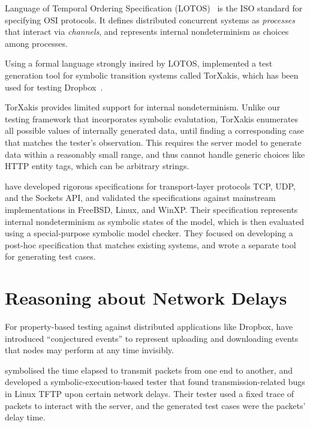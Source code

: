 \documentclass[12pt,oneside]{amsbook}
\numberwithin{section}{chapter}
\numberwithin{figure}{chapter}
\numberwithin{equation}{chapter}
\begin{document}
Language of Temporal Ordering Specification (LOTOS)~\cite{Bolognesi1987} is the
ISO standard for specifying OSI protocols.  It defines distributed concurrent
systems as {\em processes} that interact via {\em channels}, and represents
internal nondeterminism as choices among processes.

Using a formal language strongly insired by LOTOS, \textcite{torxakis-dropbox}
implemented a test generation tool for symbolic transition systems called
TorXakis, which has been used for testing Dropbox~\cite{torxakis-dropbox}.

TorXakis provides limited support for internal nondeterminism.  Unlike our
testing framework that incorporates symbolic evalutation, TorXakis enumerates
all possible values of internally generated data, until finding a corresponding
case that matches the tester's observation.  This requires the server model to
generate data within a reasonably small range, and thus cannot handle generic
choices like HTTP entity tags, which can be arbitrary strings.

\textcite{netsem} have developed rigorous specifications for transport-layer
protocols TCP, UDP, and the Sockets API, and validated the specifications
against mainstream implementations in FreeBSD, Linux, and WinXP.  Their
specification represents internal nondeterminism as symbolic states of the
model, which is then evaluated using a special-purpose symbolic model checker.
They focused on developing a post-hoc specification that matches existing
systems, and wrote a separate tool for generating test cases.

\section{Reasoning about Network Delays}
For property-based testing against distributed applications like Dropbox,
\textcite{testing-dropbox} have introduced ``conjectured events'' to represent
uploading and downloading events that nodes may perform at any time invisibly.

\textcite{pkt-dyn} symbolised the time elapsed to transmit packets from one end
to another, and developed a symbolic-execution-based tester that found
transmission-related bugs in Linux TFTP upon certain network delays.  Their
tester used a fixed trace of packets to interact with the server, and the
generated test cases were the packets' delay time.

\printbibliography
\end{document}

